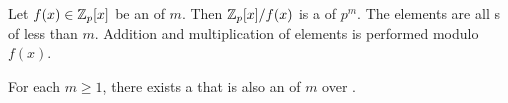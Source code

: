 \begin{theorem}\label{thm:Polynomial_Ring-Addition_Multiplication_Elements}
  Let $f(x) \in \mathbb{Z}_{p}[x]$ be an  of  $m$.
  Then $\mathbb{Z}_{p}[x] / f(x)$ is a  of  $p^{m}$.
  The elements are all s of  less than $m$.
  Addition and multiplication of elements is performed modulo $f(x)$.
\end{theorem}

\begin{lemma}\label{lemma:Polynomial_Ring-Monic_Irreducible_Polynomial_Existence}
  For each $m \geq 1$, there exists a  that is also an  of  $m$ over .
\end{lemma}
